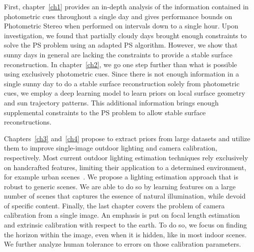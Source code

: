 First, chapter~\ref{ch1} provides an in-depth analysis of the information contained in photometric cues throughout a single day and gives performance bounds on Photometric Stereo when performed on intervals down to a single hour. Upon investigation, we found that partially cloudy days brought enough constraints to solve the PS problem using an adapted PS algorithm. However, we show that sunny days in general are lacking the constraints to provide a stable surface reconstruction. In chapter~\ref{ch2}, we go one step further than what is possible using exclusively photometric cues. Since there is not enough information in a single sunny day to do a stable surface reconstruction solely from photometric cues, we employ a deep learning model to learn priors on local surface geometry and sun trajectory patterns. This additional information brings enough supplemental constraints to the PS problem to allow stable surface reconstructions. 

Chapters~\ref{ch3} and~\ref{ch4} propose to extract priors from large datasets and utilize them to improve single-image outdoor lighting and camera calibration, respectively. Most current outdoor lighting estimation techniques rely exclusively on handcrafted features, limiting their application to a determined environment, for example urban scenes~\cite{lalonde-ijcv-12}. We propose a lighting estimation approach that is robust to generic scenes. We are able to do so by learning features on a large number of scenes that captures the essence of natural illumination, while devoid of specific content. Finally, the last chapter covers the problem of camera calibration from a single image. An emphasis is put on focal length estimation and extrinsic calibration with respect to the earth. To do so, we focus on finding the horizon within the image, even when it is hidden, like in most indoor scenes. We further analyze human tolerance to errors on those calibration parameters. 



%
%

